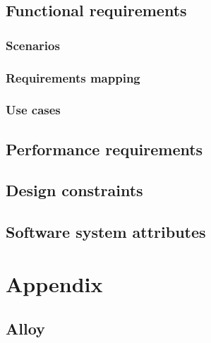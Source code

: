 \documentclass[a4paper,oneside,11pt]{article}
\begin{document}
        \subsection{Functional requirements}
            
        \subsubsection{Scenarios}
            
            
        \subsubsection{Requirements mapping}
            
         \newpage
         
        \subsubsection{Use cases}
            
       \newpage  
        \subsection{Performance requirements}
            
         \newpage    
        \subsection{Design constraints}
            
         \newpage
        \subsection{Software system attributes}
            
        \newpage
        
        \section{Appendix}
            \subsection{Alloy}
                
\end{document}
